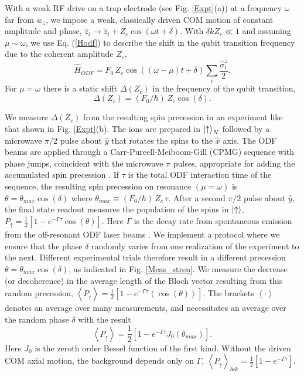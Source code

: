 \documentclass[aps,prl,twocolumn,superscriptaddress,floatfix]{revtex4-1}
\begin{document}
With a weak RF drive on a trap electrode (see Fig. \ref{Expt}(a)) at a frequency $\omega$ far from $w_{z}$, we impose a weak, classically driven COM motion of constant amplitude and phase, $\hat{z}_i \rightarrow \hat{z}_i +Z_c\cos(\omega t+\delta)$. With $\delta k Z_c \ll 1$ and assuming $\mu\sim\omega$, we use Eq. (\ref{Hodf}) to describe the shift in the qubit transition frequency due to the coherent amplitude $Z_c$,
\begin{equation}
\hat{H}_{ODF} = F_{0} \, Z_c\cos((\omega - \mu)t + \delta) \sum_{i} \frac{\hat{\sigma}^{z}_{i}}{2} .
\end{equation}
For $\mu = \omega$ there is a static shift $\Delta(Z_c)$ in the frequency of the qubit transition, 
\begin{equation}
\Delta(Z_c) = (F_{0}/\hbar) \, Z_c \cos(\delta).
\label{frequency shift}
\end{equation}

We measure $\Delta(Z_c)$ from the resulting spin precession in an experiment like that shown in Fig. \ref{Expt}(b). The ions are prepared in $\ket{\uparrow}_N$ followed by a microwave $\pi/2$ pulse about $\hat{y}$ that rotates the spins to the $\hat{x}$ axis. The ODF beams are applied through a Carr-Purcell-Meiboom-Gill (CPMG) sequence with phase jumps, coincident with the microwave $\pi$ pulses, appropriate for adding the accumulated spin precession \citep{Kotler2011,SuppMat}. If $\tau$ is the total ODF interaction time of the sequence, the resulting spin precession on resonance $(\mu = \omega)$ is $\theta = \theta_{max} \cos(\delta)$ where $\theta_{max} \equiv (F_{0}/\hbar)\, Z_c \, \tau$. After a second $\pi/2$ pulse about $\hat{y}$, the final state readout measures the population of the spins in $\ket{\uparrow}$, $P_{\uparrow} = \frac{1}{2}[1-e^{-\Gamma \tau}\cos(\theta)]$. Here $\Gamma$ is the decay rate from spontaneous emission from the off-resonant ODF laser beams \citep{Uys2010}. We implement a protocol where we ensure that the phase $\delta$ randomly varies from one realization of the experiment to the next. Different experimental trials therefore result in a different precession $\theta = \theta_{max} \cos(\delta)$, as indicated in Fig. \ref{Meas_stren}. We measure the decrease (or decoherence) in the average length of the Bloch vector resulting from this random precession, $\left< P_{\uparrow} \right> = \frac{1}{2}[1-e^{-\Gamma \tau} \left<\cos(\theta)\right>]$. The brackets $ \left< \cdot \right> $ denotes an average over many measurements, and necessitates an average over the random phase $\delta$ with the result \citep{Kotler2013}
\begin{equation}
\left< P_{\uparrow} \right> = \frac{1}{2} \left[ 1-e^{-\Gamma \tau}J_0(\theta_{max}) \right].
\label{Bessel}
\end{equation}
Here $J_0$ is the zeroth order Bessel function of the first kind. Without the driven COM axial motion, the background depends only on $\Gamma$, $\left\langle P_{\uparrow}\right\rangle _{bck}= \frac{1}{2}\left[1-e^{-\Gamma\tau}\right]$.
\end{document}
